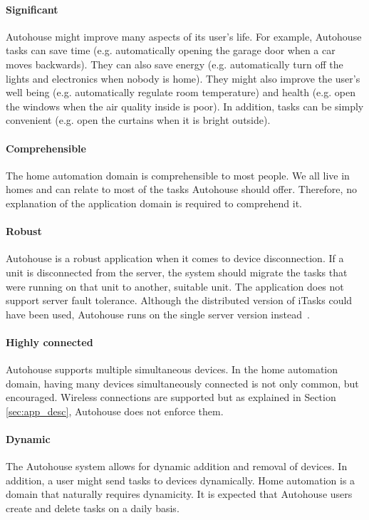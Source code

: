 \paragraph{Significant} Autohouse might improve many aspects of its user's life. For example, Autohouse tasks can save time (e.g. automatically opening the garage door when a car moves backwards). They can also save energy (e.g. automatically turn off the lights and electronics when nobody is home). They might also improve the user's well being (e.g. automatically regulate room temperature) and health (e.g. open the windows when the air quality inside is poor). In addition, tasks can be simply convenient (e.g. open the curtains when it is bright outside).

\paragraph{Comprehensible} The home automation domain is comprehensible to most people. We all live in homes and can relate to most of the tasks Autohouse should offer. Therefore, no explanation of the application domain is required to comprehend it. 

\paragraph{Robust} Autohouse is a robust application when it comes to device disconnection. If a unit is disconnected from the server, the system should migrate the tasks that were running on that unit to another, suitable unit. The application does not support server fault tolerance. Although the distributed version of \gls{iTasks} could have been used, Autohouse runs on the single server version instead~\cite{distributed}.

\paragraph{Highly connected} Autohouse supports multiple simultaneous devices. In the home automation domain, having many devices simultaneously connected is not only common, but encouraged. Wireless connections are supported but as explained in Section \ref{sec:app_desc}, Autohouse does not enforce them. 

\paragraph{Dynamic} The Autohouse system allows for dynamic addition and removal of devices. In addition, a user might send tasks to devices dynamically. Home automation is a domain that naturally requires dynamicity. It is expected that Autohouse users create and delete tasks on a daily basis.

